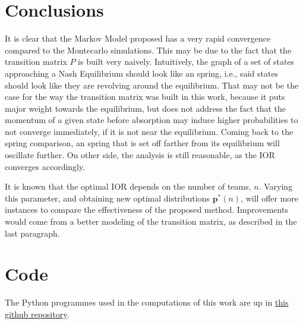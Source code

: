 \documentclass{article}
\newcommand{\pp}{\mathbf{p}}
\begin{document}
\section{Conclusions}\label{sec5}
It is clear that the Markov Model proposed has a very rapid convergence compared to the Montecarlo simulations. This may be due to the fact that the transition matrix $P$ is built very naively. Intuitively, the graph of a set of states approaching a Nash Equilibrium should look like an spring, i.e., said states should look like they are revolving around the equilibrium. That may not be the case for the way the transition matrix was built in this work, because it puts major weight towards the equilibrium, but does not address the fact that the momentum of a given state before absorption may induce higher probabilities to not converge immediately, if it is not near the equilibrium. Coming back to the spring comparison, an spring that is set off farther from its equilibrium will oscillate further. On other side, the analysis is still reasonable, as the IOR converges accordingly.\par
It is known that the optimal IOR depends on the number of teams, $n$. Varying this parameter, and obtaining new optimal distributions $\pp^*(n)$, will offer more instances to compare the effectiveness of the proposed method.
Improvements would come from a better modeling of the transition matrix, as described in the last paragraph.\par 

\section*{Code}
The Python programmes used in the computations of this work are up in \href{https://github.com/NeutralElement/Stochastic-Processes-Project}{this github repository}.

\newpage




\end{document}
